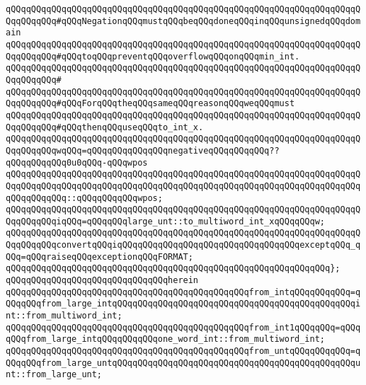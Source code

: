 \newline
\verb|qQQqqQQqqQQqqQQqqQQqqQQqqQQqqQQqqQQqqQQqqQQqqQQqqQQqqQQqqQQqqQQqqQQqqQQqqQQqqQQq#qQQqNegationqQQqmustqQQqbeqQQqdoneqQQqinqQQqunsignedqQQqdomain|\newline
\verb|qQQqqQQqqQQqqQQqqQQqqQQqqQQqqQQqqQQqqQQqqQQqqQQqqQQqqQQqqQQqqQQqqQQqqQQqqQQqqQQq#qQQqtoqQQqpreventqQQqoverflowqQQqonqQQqmin_int.|\newline
\verb|qQQqqQQqqQQqqQQqqQQqqQQqqQQqqQQqqQQqqQQqqQQqqQQqqQQqqQQqqQQqqQQqqQQqqQQqqQQqqQQq#|\newline
\verb|qQQqqQQqqQQqqQQqqQQqqQQqqQQqqQQqqQQqqQQqqQQqqQQqqQQqqQQqqQQqqQQqqQQqqQQqqQQqqQQq#qQQqForqQQqtheqQQqsameqQQqreasonqQQqweqQQqmust|\newline
\verb|qQQqqQQqqQQqqQQqqQQqqQQqqQQqqQQqqQQqqQQqqQQqqQQqqQQqqQQqqQQqqQQqqQQqqQQqqQQqqQQq#qQQqthenqQQquseqQQqto_int_x.|\newline
\newline
\verb|qQQqqQQqqQQqqQQqqQQqqQQqqQQqqQQqqQQqqQQqqQQqqQQqqQQqqQQqqQQqqQQqqQQqqQQqqQQqqQQqwqQQq=qQQqqQQqqQQqqQQqnegativeqQQqqQQqqQQq??qQQqqQQqqQQq0u0qQQq-qQQqwpos|\newline
\verb|qQQqqQQqqQQqqQQqqQQqqQQqqQQqqQQqqQQqqQQqqQQqqQQqqQQqqQQqqQQqqQQqqQQqqQQqqQQqqQQqqQQqqQQqqQQqqQQqqQQqqQQqqQQqqQQqqQQqqQQqqQQqqQQqqQQqqQQqqQQqqQQqqQQqqQQq::qQQqqQQqqQQqwpos;|\newline
\newline
\verb|qQQqqQQqqQQqqQQqqQQqqQQqqQQqqQQqqQQqqQQqqQQqqQQqqQQqqQQqqQQqqQQqqQQqqQQqqQQqqQQqiqQQq=qQQqqQQqlarge_unt::to_multiword_int_xqQQqqQQqw;|\newline
\newline
\verb|qQQqqQQqqQQqqQQqqQQqqQQqqQQqqQQqqQQqqQQqqQQqqQQqqQQqqQQqqQQqqQQqqQQqqQQqqQQqqQQqconvertqQQqiqQQqqQQqqQQqqQQqqQQqqQQqqQQqqQQqqQQqexceptqQQq_qQQq=qQQqraiseqQQqexceptionqQQqFORMAT;|\newline
\verb|qQQqqQQqqQQqqQQqqQQqqQQqqQQqqQQqqQQqqQQqqQQqqQQqqQQqqQQqqQQqqQQq};|\newline
\verb|qQQqqQQqqQQqqQQqqQQqqQQqqQQqqQQqherein|\newline
\newline
\verb|qQQqqQQqqQQqqQQqqQQqqQQqqQQqqQQqqQQqqQQqqQQqqQQqfrom_intqQQqqQQqqQQq=qQQqqQQqfrom_large_intqQQqqQQqqQQqqQQqqQQqqQQqqQQqqQQqqQQqqQQqqQQqqQQqint::from_multiword_int;|\newline
\verb|qQQqqQQqqQQqqQQqqQQqqQQqqQQqqQQqqQQqqQQqqQQqqQQqfrom_int1qQQqqQQq=qQQqqQQqfrom_large_intqQQqqQQqqQQqone_word_int::from_multiword_int;|\newline
\verb|qQQqqQQqqQQqqQQqqQQqqQQqqQQqqQQqqQQqqQQqqQQqqQQqfrom_untqQQqqQQqqQQq=qQQqqQQqfrom_large_untqQQqqQQqqQQqqQQqqQQqqQQqqQQqqQQqqQQqqQQqqQQqqQQqunt::from_large_unt;|\newline
